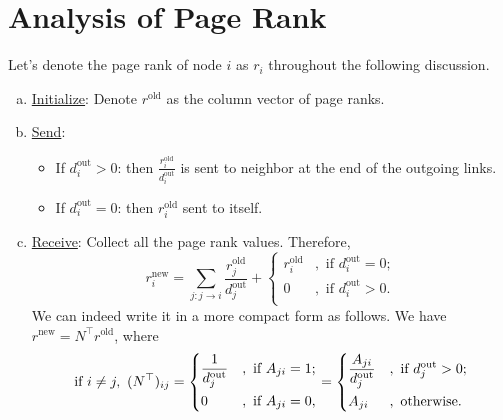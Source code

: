 \section{Analysis of Page Rank}
Let's denote the page rank of node \(i\) as \(r_i\) throughout the following discussion.
\begin{enumerate}[(a)]
	\item \hyperref[algo:basic-page-rank-algorithm:initialize]{Initialize}: Denote \(r^{\text{old}}\) as the column vector of page ranks.
	\item \hyperref[algo:basic-page-rank-algorithm:send]{Send}:
	      \begin{itemize}
		      \item If \(d^{\text{out}}_i > 0\): then \(\frac{r_{i}^{\text{old}}}{d_{i}^{\text{out}}}\) is sent to neighbor at the end of the outgoing links.
		      \item If \(d_{i}^{\text{out}} = 0\): then \(r_{i}^{\text{old}}\) sent to itself.
	      \end{itemize}
	\item \hyperref[algo:basic-page-rank-algorithm:receive]{Receive}: Collect all the page rank values. Therefore,
	      \[
		      r_{i}^{\text{new}} = \sum\limits_{j:j\to i}\frac{r_{j}^{\text{old}}}{d_{j}^{\text{out}}}+\begin{cases}
			      r_{i}^{\text{old}} & , \text{ if }d_{i}^{\text{out}} = 0; \\
			      0                  & , \text{ if }d_{i}^{\text{out}} > 0. \\
		      \end{cases}
	      \]
	      We can indeed write it in a more compact form as follows. We have \(r^{\text{new}} = N^{\top} r^{\text{old}}\), where
	      \[
		      \begin{alignedat}{3}
			      &\text{if }i\neq  j,\ (N^{\top})_{ij} = \begin{dcases}
				      \frac{1}{d_{j}^{\text{out}}} & , \text{ if } A_{ji} = 1; \\
				      0                            & , \text{ if } A_{ji} = 0, \\
			      \end{dcases} &&= \begin{dcases}
				      \frac{A_{ji}}{d_{j}^{\text{out}}} & , \text{ if }d_{j}^{\text{out}}>0; \\
				      A_{ji}                            & , \text{ otherwise}.               \\
			      \end{dcases}\\

\end{alignedat}\]
\end{enumerate}
